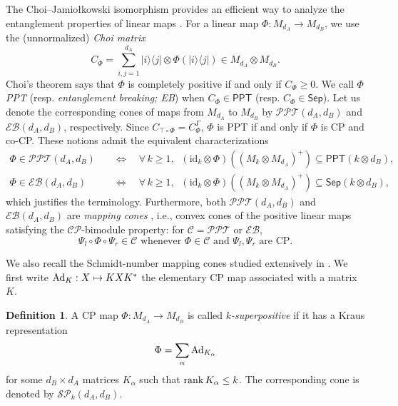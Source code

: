 \documentclass[11pt,reqno]{amsart}
\theoremstyle{definition}
\newtheorem{definition}[theorem]{Definition}
\theoremstyle{definition}
\theoremstyle{definition}
\theoremstyle{definition}
\newcommand{\la}{\langle}
\newcommand{\ra}{\rangle}
\newcommand{\id}{\mathrm{id}}
\newcommand{\Sep}{\mathsf{Sep}}
\newcommand{\ppt}{\mathsf{PPT}}
\newcommand{\CP}{\mathcal{CP}}
\newcommand{\SP}{\mathcal{SP}}
\newcommand{\EB}{\mathcal{EB}}
\newcommand{\PPT}{\mathcal{PPT}}
\newcommand{\Ad}{{\rm Ad}}
\begin{document}
The Choi--Jamio{\l}kowski isomorphism provides an efficient way to analyze the entanglement properties of linear maps \cite{Jam72,Cho75a}. 
For a linear map $\Phi:M_{d_A}\to M_{d_B}$, we use the (unnormalized) \emph{Choi matrix}
    $$C_{\Phi}=\sum_{i,j=1}^{d_A} |i\ra\la j|\otimes\Phi(|i\ra\la j|)
 \in M_{d_A}\otimes M_{d_B}.$$
Choi's theorem \cite{Cho75a} says that $\Phi$ is completely positive if and only if
$C_{\Phi}\geq 0$. 
We call $\Phi$ \emph{PPT} (resp. \emph{entanglement breaking; EB}) when $C_{\Phi}\in \ppt$ (resp. $C_{\Phi} \in \Sep$). Let us denote the corresponding cones of maps from $M_{d_A}$ to $M_{d_B}$ by $\PPT(d_A,d_B)$ and $\EB(d_A,d_B)$, respectively. Since $C_{\top \circ \Phi} = C_{\Phi}^{\Gamma}$, $\Phi$ is PPT if and only if $\Phi$ is CP and co-CP. These notions admit the equivalent characterizations \cite{HSR03,TextHol} 
\begin{align*}
    \Phi\in \PPT(d_A,d_B) \quad &\iff \quad \forall\,k\geq 1, \;\;(\id_k\otimes \Phi)((M_{k}\otimes M_{d_A})^+)\subseteq \ppt(k\otimes d_B),\\
    \Phi\in \EB(d_A,d_B) \quad &\iff \quad \forall\,k\geq 1, \;\;(\id_k\otimes \Phi)((M_{k}\otimes M_{d_A})^+)\subseteq \Sep(k\otimes d_B),
\end{align*}
which justifies the terminology. Furthermore, both $\PPT(d_A,d_B)$ and $\EB(d_A,d_B)$ are \emph{mapping cones} \cite{Sto86,GKS21,Kye23}, i.e., convex cones of the positive linear maps satisfying the $\CP$-bimodule property: for $\mathcal{C}=\PPT$ or $\EB$,
\begin{equation} \label{eq:MappingCone}
    \Psi_l\circ \Phi\circ \Psi_r\in \mathcal{C} \text{ whenever $\Phi\in \mathcal{C}$ and $\Psi_l,\Psi_r$ are CP}.
\end{equation}

We also recall the Schmidt-number mapping cones studied extensively in \cite{SSZ09}. We first write $\Ad_K: X\mapsto KXK^*$ the elementary CP map associated with a matrix $K$.
\begin{definition}\label{def:SP}
A CP map $\Phi:M_{d_A}\to M_{d_B}$ is called \emph{$k$-superpositive} if it
has a Kraus representation
    $$\Phi=\sum_\alpha\Ad_{K_\alpha}$$
for some $d_B\times d_A$ matrices $K_{\alpha}$ such that $\rank K_\alpha\leq k$. The corresponding cone is denoted by $\SP_k(d_A,d_B)$.
\end{definition}
\end{document}
